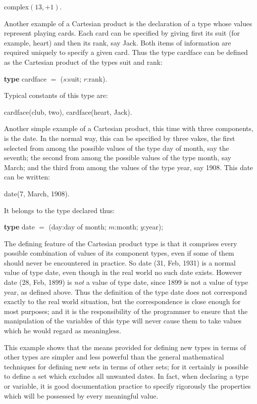 \quad complex$(13, + 1)$.

\noindent
Another example of a Cartesian product is the declaration of a type whose values represent playing cards. Each card can be specified by giving first its suit (for example, heart) and then its rank, say Jack. Both items of information are required uniquely to specify a given card. Thus the type cardface can be defined as the Cartesian product of the types suit and rank:

\quad \textbf{type} cardface $=$ ($s$:suit; $r$:rank).

Typical constants of this type are:

\quad cardface(club, two), cardface(heart, Jack).

Another simple example of a Cartesian product, this time with three
components, is the date. In the normal way, this can be specified by three
vakes, the first selected from among the possible values of the type day of
month, say the seventh; the second from among the possible values of the
type month, say March; and the third from among the values of the type
year, say 1908. This date can be written:

\quad date(7, March, 1908).

\noindent
It belongs to the type declared thus:

\quad \textbf{type} date $=$ (day:day of month; $m$:month; $y$:year);

The defining feature of the Cartesian product type is that it comprises every possible combination of values of its component types, even if some of them should never be encountered in practice. So date (31, Feb, 1931) is a normal value of type date, even though in the real world no such date exists. However date (28, Feb, 1899) is \textit{not} a value of type date, since 1899 is not a value of type year, as defined above. Thus the definition of the type date does not correspond exactly to the real world situation, but the correspondence is close enough for most purposes; and it is the responsibility of the programmer to ensure that the manipulation of the variables of this type will never cause them to take values which he would regard as meaningless.

This example shows that the means provided for defining new types in terms of other types are simpler and less powerful than the general mathematical techniques for defining new sets in terms of other sets; for it certainly is possible to define a set which excludes all unwanted dates. In fact, when declaring a type or variable, it is good documentation practice to specify rigorously the properties which will be possessed by every meaningful value.
 
